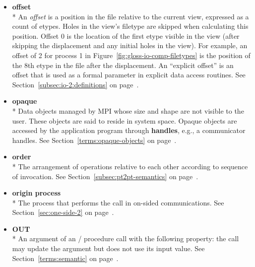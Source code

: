 \begin{itemize}
\label{glossary:offset}
\item \textbf{ offset} \\* 
An {\it offset} is a position
in the file
relative to the current view,
expressed as a count of etypes.
Holes in the view's filetype are skipped when calculating this position.
Offset 0 is the location of the first etype visible in the view
(after skipping the displacement and any initial holes in the view).
For example, an offset of 2 for process 1
in Figure~\ref{fig:gloss-io-comp-filetypes} is the position
of the 8th etype in the file after the displacement.
An ``explicit offset'' is an offset that is used as a formal parameter
in explicit data access routines.
See Section~\ref{subsec:io-2:definitions} on page~\pageref{subsec:io-2:definitions}.

\label{glossary:opaque}
\item \textbf{ opaque} \\*
Data objects managed by MPI whose size and shape are not visible to the user. These objects are said to reside in system space.
Opaque objects are accessed by the application program through {\bf handles}, e.g., a communicator handles. 
See Section~\ref{terms:opaque-objects} on page~\pageref{terms:opaque-objects}.

\label{glossary:order}
\item \textbf{ order} \\*
The arrangement of operations relative to each other according to sequence of invocation.
See Section~\ref{subsec:pt2pt-semantics} on page~\pageref{subsec:pt2pt-semantics}.

\label{glossary:origin_process}
\item \textbf{ origin process} \\*
The process that performs the call in on-sided communications.
See Section~\ref{sec:one-side-2} on page~\pageref{sec:one-side-2}.

\label{glossary:OUT}
\item \textbf{ OUT} \\*
An argument of an \MPI/ procedure call with the following property: the call may update the argument but does not use its input value.
See Section~\ref{terms:semantic} on page~\pageref{terms:semantic}.


\end{itemize}
